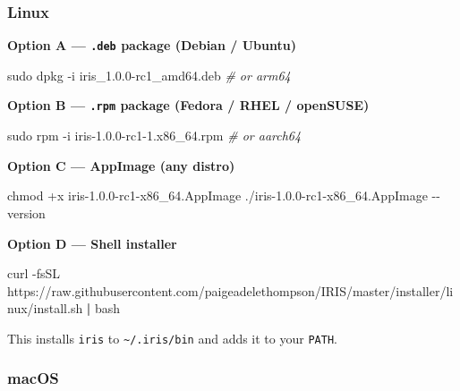 \documentclass[
  english,
]{book}
\newenvironment{Shaded}{\begin{snugshade}}{\end{snugshade}}
\newcommand{\AttributeTok}[1]{\textcolor[rgb]{0.83,0.83,0.83}{#1}}
\newcommand{\CommentTok}[1]{\textcolor[rgb]{0.42,0.60,0.33}{\textit{#1}}}
\newcommand{\ExtensionTok}[1]{\textcolor[rgb]{0.83,0.83,0.83}{#1}}
\newcommand{\FunctionTok}[1]{\textcolor[rgb]{0.86,0.86,0.67}{#1}}
\newcommand{\KeywordTok}[1]{\textcolor[rgb]{0.34,0.61,0.84}{\textbf{#1}}}
\newcommand{\NormalTok}[1]{\textcolor[rgb]{0.83,0.83,0.83}{#1}}
\begin{document}
\subsubsection{Linux}\label{linux}

\textbf{Option A --- \texttt{.deb} package (Debian / Ubuntu)}

\begin{Shaded}
\begin{Highlighting}[]
\FunctionTok{sudo}\NormalTok{ dpkg }\AttributeTok{{-}i}\NormalTok{ iris\_1.0.0{-}rc1\_amd64.deb   }\CommentTok{\# or arm64}
\end{Highlighting}
\end{Shaded}

\textbf{Option B --- \texttt{.rpm} package (Fedora / RHEL / openSUSE)}

\begin{Shaded}
\begin{Highlighting}[]
\FunctionTok{sudo}\NormalTok{ rpm }\AttributeTok{{-}i}\NormalTok{ iris{-}1.0.0{-}rc1{-}1.x86\_64.rpm   }\CommentTok{\# or aarch64}
\end{Highlighting}
\end{Shaded}

\textbf{Option C --- AppImage (any distro)}

\begin{Shaded}
\begin{Highlighting}[]
\FunctionTok{chmod}\NormalTok{ +x iris{-}1.0.0{-}rc1{-}x86\_64.AppImage}
\ExtensionTok{./iris{-}1.0.0{-}rc1{-}x86\_64.AppImage} \AttributeTok{{-}{-}version}
\end{Highlighting}
\end{Shaded}

\textbf{Option D --- Shell installer}

\begin{Shaded}
\begin{Highlighting}[]
\ExtensionTok{curl} \AttributeTok{{-}fsSL}\NormalTok{ https://raw.githubusercontent.com/paigeadelethompson/IRIS/master/installer/linux/install.sh }\KeywordTok{|} \FunctionTok{bash}
\end{Highlighting}
\end{Shaded}

This installs \texttt{iris} to \texttt{\textasciitilde{}/.iris/bin} and
adds it to your \texttt{PATH}.

\subsubsection{macOS}\label{macos}
\end{document}
